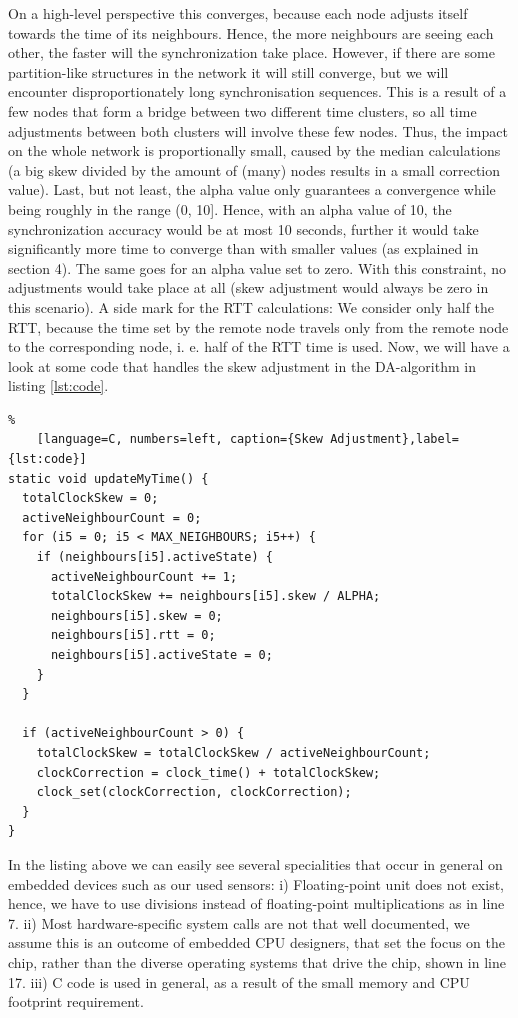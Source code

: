 \documentclass{llncs}
\begin{document}
\noindent On a high-level perspective this converges, because each node adjusts itself towards the time of its neighbours. Hence, the more neighbours are seeing each other, the faster will the synchronization take place. However, if there are some partition-like structures in the network it will still converge, but we will encounter disproportionately long synchronisation sequences. This is a result of a few nodes that form a bridge between two different time clusters, so all time adjustments between both clusters will involve these few nodes. Thus, the impact on the whole network is proportionally small, caused by the median calculations (a big skew divided by the amount of (many) nodes results in a small correction value). Last, but not least, the alpha value only guarantees a convergence while being roughly in the range (0, 10]. Hence, with an alpha value of 10, the synchronization accuracy would be at most 10 seconds, further it would take significantly more time to converge than with smaller values (as explained in section 4). The same goes for an alpha value set to zero. With this constraint, no adjustments would take place at all (skew adjustment would always be zero in this scenario).
\bigbreak
\noindent A side mark for the RTT calculations: We consider only half the RTT, because the time set by the remote node travels only from the remote node to the corresponding node, i. e. half of the RTT time is used.
\bigbreak
\noindent
Now, we will have a look at some code that handles the skew adjustment in the DA-algorithm in listing \ref{lst:code}.

\begin{lstlisting}%
	[language=C, numbers=left, caption={Skew Adjustment},label={lst:code}]
static void updateMyTime() {
  totalClockSkew = 0;
  activeNeighbourCount = 0;
  for (i5 = 0; i5 < MAX_NEIGHBOURS; i5++) {
    if (neighbours[i5].activeState) {
      activeNeighbourCount += 1;
      totalClockSkew += neighbours[i5].skew / ALPHA;
      neighbours[i5].skew = 0;
      neighbours[i5].rtt = 0;
      neighbours[i5].activeState = 0;
    }
  }

  if (activeNeighbourCount > 0) {
    totalClockSkew = totalClockSkew / activeNeighbourCount;
    clockCorrection = clock_time() + totalClockSkew;
    clock_set(clockCorrection, clockCorrection);
  }
}
\end{lstlisting}
\noindent In the listing above we can easily see several specialities that occur in general on embedded devices such as our used sensors: i) Floating-point unit does not exist, hence, we have to use divisions instead of floating-point multiplications as in line 7. ii) Most hardware-specific system calls are not that well documented, we assume this is an outcome of embedded CPU designers, that set the focus on the chip, rather than the diverse operating systems that drive the chip, shown in line 17. iii) C code is used in general, as a result of the small memory and CPU footprint requirement.
\end{document}
